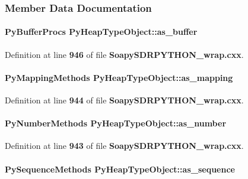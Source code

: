 \subsubsection{Member Data Documentation}
\paragraph[{as\+\_\+buffer}]{\setlength{\rightskip}{0pt plus 5cm}Py\+Buffer\+Procs Py\+Heap\+Type\+Object\+::as\+\_\+buffer}\label{structPyHeapTypeObject_a026c64b0a5163ea580e79640ecf209de}


Definition at line {\bf 946} of file {\bf Soapy\+S\+D\+R\+P\+Y\+T\+H\+O\+N\+\_\+wrap.\+cxx}.

\paragraph[{as\+\_\+mapping}]{\setlength{\rightskip}{0pt plus 5cm}Py\+Mapping\+Methods Py\+Heap\+Type\+Object\+::as\+\_\+mapping}\label{structPyHeapTypeObject_a3112d193aea288a92036360bec1ce0a5}


Definition at line {\bf 944} of file {\bf Soapy\+S\+D\+R\+P\+Y\+T\+H\+O\+N\+\_\+wrap.\+cxx}.

\paragraph[{as\+\_\+number}]{\setlength{\rightskip}{0pt plus 5cm}Py\+Number\+Methods Py\+Heap\+Type\+Object\+::as\+\_\+number}\label{structPyHeapTypeObject_a795de378df40d11321c0dbe463759560}


Definition at line {\bf 943} of file {\bf Soapy\+S\+D\+R\+P\+Y\+T\+H\+O\+N\+\_\+wrap.\+cxx}.

\paragraph[{as\+\_\+sequence}]{\setlength{\rightskip}{0pt plus 5cm}Py\+Sequence\+Methods Py\+Heap\+Type\+Object\+::as\+\_\+sequence}\label{structPyHeapTypeObject_ad553caad5da3a7004aae1b7ac0289f12}


